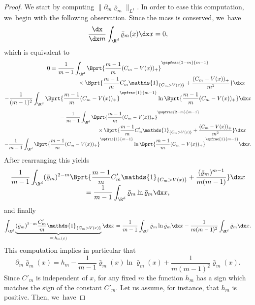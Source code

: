 \begin{proof}
We start by computing $\|\partial_m \bar\varrho_m\|_{L^1}$. In order to ease this computation, we~begin with the following observation.
Since the mass is conserved, we~have
\begin{align*}
\frac{\dx}{\dx m} \int_{\R^d} \bar\varrho_m(x) \dx x = 0,
\end{align*}
which is equivalent to
\begin{multline*}
0= \frac{1}{m-1}\int_{\R^d} \Bprt{\frac{m-1}{m}(C_m - V(x))_+}^{\pspfrac{2-m}{m-1}}\\[-3pt]
\shoveright{{}\times\Bprt{\frac{m-1}{m}C'_m{\mathds{1}_{\{C_m > V(x)\}}} + \frac{(C_m - V(x))_+}{m^2}} \dx x}\\
- {\frac{1}{(m-1)^{2}}} \int_{\R^d} \Bprt{\frac{m-1}{m}(C_m - V(x))_+}^{\spfrac{1}{m-1}} \ln \Bprt{\frac{m-1}{m}(C_m - V(x))_+} \dx x
\end{multline*}
\begin{multline*}
\hphantom{0} = \frac{1}{m-1}\int_{\R^d} \Bprt{\frac{m-1}{m}(C_m - V(x))_+}^{\pspfrac{2-m}{m-1}}\\[-3pt]
\shoveright{{}\times\Bprt{\frac{m-1}{m}C'_m{\mathds{1}_{\{C_m > V(x)\}}} + \frac{(C_m - V(x))_+}{m^2}} \dx x} \\
- \frac{1}{m-1} \int_{\R^d} \Bprt{\frac{m-1}{m}(C_m - V(x))_+}^{\spfrac{1}{m-1}} \ln \Bprt{\frac{m-1}{m}(C_m - V(x))_+}^{\spfrac{1}{m-1}} \dx x.
\end{multline*}
After rearranging this yields
\begin{multline*}
\frac{1}{m-1}\int_{\R^d} (\bar\varrho_m)^{2-m} \Bprt{\frac{m-1}{m}C'_m{\mathds{1}_{\{C_m > V(x)\}}} + \frac{(\bar\varrho_m)^{m-1}}{m(m-1)}} \dx x\\[-5pt]
= \frac{1}{m-1} \int_{\R^d} \bar\varrho_m \ln \bar\varrho_m \dx x,
\end{multline*}
and finally
\begin{align*}
\int_{\R^d} \underbrace{(\bar\varrho_m)^{2-m} \frac{C'_m}{m}{{\mathds{1}_{\{C_m > V(x)\}}}}}_{=:h_m(x)}\dx x= \frac{1}{m-1} \int_{\R^d} \bar\varrho_m \ln \bar\varrho_m\dx x - \frac{1}{m(m-1)^2}\int_{\R^d} \bar\varrho_m \dx x.
\end{align*}
This computation implies in particular that
\[
\partial_{m}\bar \varrho_m(x) = h_m - \frac{1}{m-1}\bar\varrho_m(x) \ln \bar\varrho_m(x) + \frac{1}{m(m-1)^2}\bar\varrho_m(x).
\]
Since $C'_m$ is independent of $x$, for any fixed $m$ the function $h_m$ has a sign which matches the sign of the constant $C'_{m}$. Let us assume, for instance, that $h_m$ is positive. Then, we~have

\end{proof}
